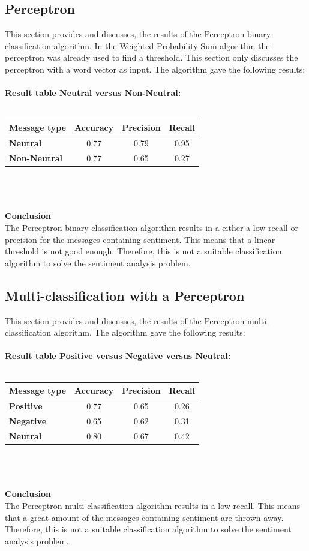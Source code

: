 \documentclass[11pt]{article}
\begin{document}
\subsection{Perceptron}
This section provides and discusses, the results of the Perceptron binary-classification algorithm. In the Weighted Probability Sum algorithm the perceptron was already used to find a threshold. This section only discusses the perceptron with a word vector as input. The algorithm gave the following results:\\\\
\textbf{Result table Neutral versus Non-Neutral:}\\\\
\begin{tabular}{| l || c | c | c |}
\hline
\textbf{Message type} & \textbf{Accuracy} & \textbf{Precision} & \textbf{Recall}\\
\hline \hline
\textbf{Neutral} & 0.77 & 0.79 & 0.95\\
\hline
\textbf{Non-Neutral} & 0.77 & 0.65 & 0.27\\
\hline
\end{tabular}\\\\\\
\textbf{Conclusion}\\
The Perceptron binary-classification algorithm results in a either a low recall or precision for the messages containing sentiment. This means that a linear threshold is not good enough. Therefore, this is not a suitable classification algorithm to solve the sentiment analysis problem.

\subsection{Multi-classification with a Perceptron}
This section provides and discusses, the results of the Perceptron multi-classification algorithm. The algorithm gave the following results:\\\\
\textbf{Result table Positive versus Negative versus Neutral:}\\\\
\begin{tabular}{| l || c | c | c |}
\hline
\textbf{Message type} & \textbf{Accuracy} & \textbf{Precision} & \textbf{Recall}\\
\hline \hline
\textbf{Positive} & 0.77 & 0.65 & 0.26\\
\hline
\textbf{Negative} & 0.65 & 0.62 & 0.31\\
\hline
\textbf{Neutral}  & 0.80 & 0.67 & 0.42\\
\hline
\end{tabular}\\\\\\
\textbf{Conclusion}\\
The Perceptron multi-classification algorithm results in a low recall. This means that a great amount of the messages containing sentiment are thrown away. Therefore, this is not a suitable classification algorithm to solve the sentiment analysis problem.
\end{document}
